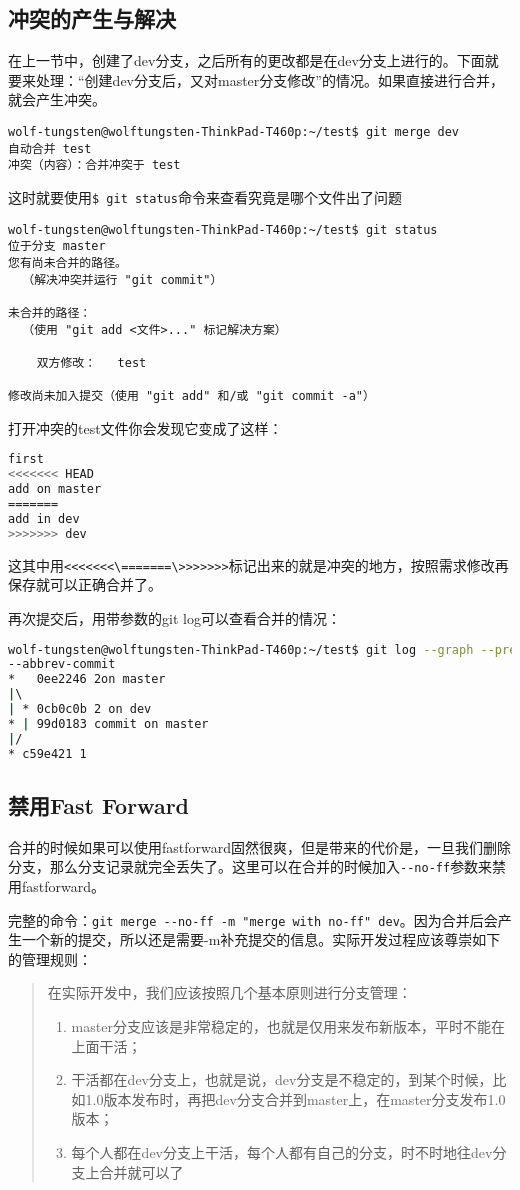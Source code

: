 \documentclass[UTF8]{ctexart}
\newenvironment{myquote}
  {\begin{quote}\kaishu\zihao{-5}}
  {\end{quote}}
\begin{document}
\subsection{冲突的产生与解决}
在上一节中，创建了dev分支，之后所有的更改都是在dev分支上进行的。下面就要来处理：“创建dev分支后，又对master分支修改”的情况。如果直接进行合并，就会产生冲突。
\begin{lstlisting}
wolf-tungsten@wolftungsten-ThinkPad-T460p:~/test$ git merge dev
自动合并 test
冲突（内容）：合并冲突于 test
\end{lstlisting}
这时就要使用\verb!$ git status!命令来查看究竟是哪个文件出了问题

\begin{lstlisting}
wolf-tungsten@wolftungsten-ThinkPad-T460p:~/test$ git status
位于分支 master
您有尚未合并的路径。
  （解决冲突并运行 "git commit"）

未合并的路径：
  （使用 "git add <文件>..." 标记解决方案）

	双方修改：   test

修改尚未加入提交（使用 "git add" 和/或 "git commit -a"）
\end{lstlisting}
打开冲突的test文件你会发现它变成了这样：
\begin{lstlisting}[language=bash]
first
<<<<<<< HEAD
add on master
=======
add in dev
>>>>>>> dev
\end{lstlisting}
这其中用\verb!<<<<<<<\=======\>>>>>>>!标记出来的就是冲突的地方，按照需求修改再保存就可以正确合并了。

再次提交后，用带参数的git log可以查看合并的情况：
\begin{lstlisting}[language=bash]
wolf-tungsten@wolftungsten-ThinkPad-T460p:~/test$ git log --graph --pretty=oneline 
--abbrev-commit
*   0ee2246 2on master
|\  
| * 0cb0c0b 2 on dev
* | 99d0183 commit on master
|/  
* c59e421 1
\end{lstlisting}

\subsection{禁用Fast Forward}
合并的时候如果可以使用fastforward固然很爽，但是带来的代价是，一旦我们删除分支，那么分支记录就完全丢失了。这里可以在合并的时候加入\verb！--no-ff！参数来禁用fastforward。

完整的命令：\verb!git merge --no-ff -m "merge with no-ff" dev!。因为合并后会产生一个新的提交，所以还是需要-m补充提交的信息。实际开发过程应该尊崇如下的管理规则：
\begin{myquote}
在实际开发中，我们应该按照几个基本原则进行分支管理：
\begin{enumerate}
\item master分支应该是非常稳定的，也就是仅用来发布新版本，平时不能在上面干活；
\item 干活都在dev分支上，也就是说，dev分支是不稳定的，到某个时候，比如1.0版本发布时，再把dev分支合并到master上，在master分支发布1.0版本；
\item 每个人都在dev分支上干活，每个人都有自己的分支，时不时地往dev分支上合并就可以了
\end{enumerate}
\end{myquote}
\end{document}
